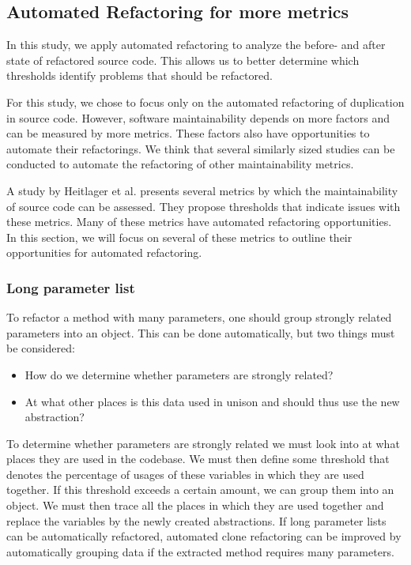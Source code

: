 \subsection{Automated Refactoring for more metrics}
In this study, we apply automated refactoring to analyze the before- and after state of refactored source code. This allows us to better determine which thresholds identify problems that should be refactored.

For this study, we chose to focus only on the automated refactoring of duplication in source code. However, software maintainability depends on more factors and can be measured by more metrics. These factors also have opportunities to automate their refactorings. We think that several similarly sized studies can be conducted to automate the refactoring of other maintainability metrics.

A study by Heitlager et al. \cite{heitlager2007practical} presents several metrics by which the maintainability of source code can be assessed. They propose thresholds that indicate issues with these metrics. Many of these metrics have automated refactoring opportunities. In this section, we will focus on several of these metrics to outline their opportunities for automated refactoring.

\subsubsection{Long parameter list}

To refactor a method with many parameters, one should group strongly related parameters into an object. This can be done automatically, but two things must be considered:
\begin{itemize}
  \item How do we determine whether parameters are strongly related?
  \item At what other places is this data used in unison and should thus use the new abstraction?
\end{itemize}
To determine whether parameters are strongly related we must look into at what places they are used in the codebase. We must then define some threshold that denotes the percentage of usages of these variables in which they are used together. If this threshold exceeds a certain amount, we can group them into an object. We must then trace all the places in which they are used together and replace the variables by the newly created abstractions. If long parameter lists can be automatically refactored, automated clone refactoring can be improved by automatically grouping data if the extracted method requires many parameters.

